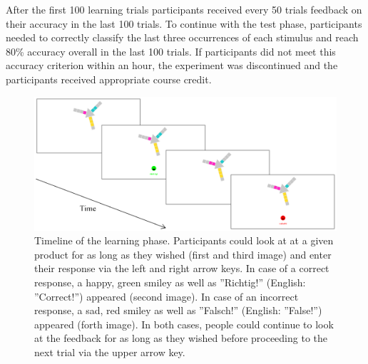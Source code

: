 \documentclass[a4paper,man,natbib]{apa6}
\begin{document}
After the first 100 learning trials participants received every 50 trials feedback on their accuracy in the last 100 trials. To continue with the test phase, participants needed to correctly classify the last three occurrences of each stimulus and reach 80\% accuracy overall in the last 100 trials. If participants did not meet this accuracy criterion within an hour, the experiment was discontinued and the participants received appropriate course credit.

\begin{figure}[htbp]
\centering
\includegraphics[width = \textwidth]{fig_timeline.png}
\caption{Timeline of the learning phase. Participants could look at at a given product for as long as they wished (first and third image) and enter their response via the left and right arrow keys. In case of a correct response, a happy, green smiley as well as ''Richtig!'' (English: ''Correct!'') appeared (second image). In case of an incorrect response, a sad, red smiley as well as ''Falsch!'' (English: ''False!'') appeared (forth image). In both cases, people could continue to look at the feedback for as long as they wished before proceeding to the next trial via the upper arrow key.}
\label{fig:timeline}
\end{figure}
\end{document}
